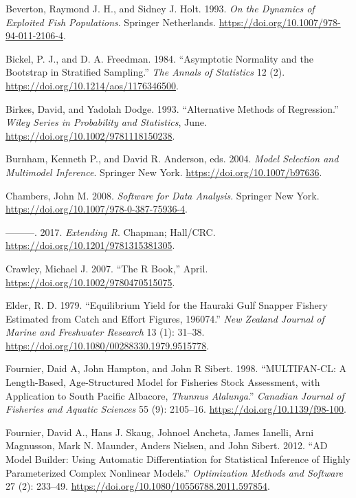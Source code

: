\documentclass[
  lang=cn,
  11pt,
  scheme=chinese,
  chinesefont=nofont,
  citestyle=gb7714-2015,
  bibstyle=gb7714-2015]{elegantbook}
\newlength{\cslhangindent}
\newenvironment{CSLReferences}[2] %
 {\begin{list}{}{%
  \setlength{\itemindent}{0pt}
  \setlength{\leftmargin}{0pt}
  \setlength{\parsep}{0pt}
  \ifodd #1
   \setlength{\leftmargin}{\cslhangindent}
   \setlength{\itemindent}{-1\cslhangindent}
  \fi
  \setlength{\itemsep}{#2\baselineskip}}}
 {\end{list}}
\begin{document}
\label{refs}
\begin{CSLReferences}{1}{0}
Beverton, Raymond J. H., and Sidney J. Holt. 1993. \emph{On the Dynamics of Exploited Fish Populations}. Springer Netherlands. \url{https://doi.org/10.1007/978-94-011-2106-4}.

Bickel, P. J., and D. A. Freedman. 1984. {``Asymptotic Normality and the Bootstrap in Stratified Sampling.''} \emph{The Annals of Statistics} 12 (2). \url{https://doi.org/10.1214/aos/1176346500}.

Birkes, David, and Yadolah Dodge. 1993. {``Alternative Methods of Regression.''} \emph{Wiley Series in Probability and Statistics}, June. \url{https://doi.org/10.1002/9781118150238}.

Burnham, Kenneth P., and David R. Anderson, eds. 2004. \emph{Model Selection and Multimodel Inference}. Springer New York. \url{https://doi.org/10.1007/b97636}.

Chambers, John M. 2008. \emph{Software for Data Analysis}. Springer New York. \url{https://doi.org/10.1007/978-0-387-75936-4}.

---------. 2017. \emph{Extending R}. Chapman; Hall/CRC. \url{https://doi.org/10.1201/9781315381305}.

Crawley, Michael J. 2007. {``The R Book,''} April. \url{https://doi.org/10.1002/9780470515075}.

Elder, R. D. 1979. {``Equilibrium Yield for the Hauraki Gulf Snapper Fishery Estimated from Catch and Effort Figures, 1960{\textendash}74.''} \emph{New Zealand Journal of Marine and Freshwater Research} 13 (1): 31--38. \url{https://doi.org/10.1080/00288330.1979.9515778}.

Fournier, Daid A, John Hampton, and John R Sibert. 1998. {``MULTIFAN-CL: A Length-Based, Age-Structured Model for Fisheries Stock Assessment, with Application to South Pacific Albacore, {\emph{Thunnus Alalunga}}.''} \emph{Canadian Journal of Fisheries and Aquatic Sciences} 55 (9): 2105--16. \url{https://doi.org/10.1139/f98-100}.

Fournier, David A., Hans J. Skaug, Johnoel Ancheta, James Ianelli, Arni Magnusson, Mark N. Maunder, Anders Nielsen, and John Sibert. 2012. {``AD Model Builder: Using Automatic Differentiation for Statistical Inference of Highly Parameterized Complex Nonlinear Models.''} \emph{Optimization Methods and Software} 27 (2): 233--49. \url{https://doi.org/10.1080/10556788.2011.597854}.


\end{CSLReferences}
\end{document}
